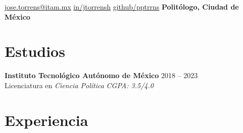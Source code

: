 \documentclass[letter]{resume}
\begin{document}

\begin{center}
\normalsize
{}
{\href{mailto://jose.torrens@itam.mx}{jose.torrens@itam.mx}}
{\href{https://www.linkedin.com/in/jtorrensh/}{in/jtorrensh}}
{\href{https://github.com/pptrrns}{github/pptrrns}}
\bfseries{Politólogo, Ciudad de México}

\end{center}



\section{Estudios}

\begin{content}

{\bf Instituto Tecnológico Autónomo de México} \hfill{2018 -- 2023}\\ 
{Licenciatura en \emph{Ciencia Política}} \hfill \emph{CGPA: 3.5/4.0}

\sectionlineskip
\end{content}


\section{Experiencia}
\end{document}

